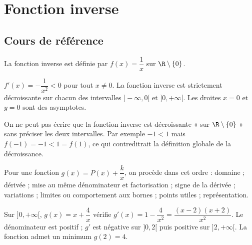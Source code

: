 
\chapter{Fonction inverse}
\section{Cours de référence}
La fonction inverse est définie par $f(x)=\dfrac1x$ sur $\R\setminus\{0\}$.

\begin{center}
\end{center}

\begin{retenir}
$f'(x)=-\dfrac1{x^2}<0$ pour tout $x\neq0$. La fonction inverse est strictement décroissante sur chacun des intervalles $]-\infty,0[$ et $]0,+\infty[$. Les droites $x=0$ et $y=0$ sont des asymptotes.
\end{retenir}

\begin{erreur}
On ne peut pas écrire que la fonction inverse est décroissante « sur $\R\setminus\{0\}$ » sans préciser les deux intervalles. Par exemple $-1<1$ mais $f(-1)=-1<1=f(1)$, ce qui contreditrait la définition globale de la décroissance.
\end{erreur}

Pour une fonction $g(x)=P(x)+\dfrac{k}{x}$, on procède dans cet ordre : domaine ; dérivée ; mise au même dénominateur et factorisation ; signe de la dérivée ; variations ; limites ou comportement aux bornes ; points utiles ; représentation.

\begin{exemple}
Sur $]0,+\infty[$, $g(x)=x+\dfrac4x$ vérifie $g'(x)=1-\dfrac4{x^2}=\dfrac{(x-2)(x+2)}{x^2}$. Le dénominateur est positif ; $g'$ est négative sur $]0,2[$ puis positive sur $]2,+\infty[$. La fonction admet un minimum $g(2)=4$.
\end{exemple}

